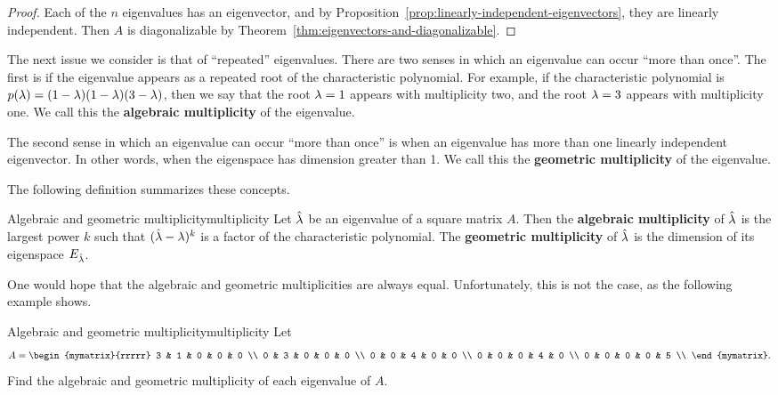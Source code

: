 \begin{proof}
  Each of the $n$ eigenvalues has an eigenvector, and by
  Proposition~\ref{prop:linearly-independent-eigenvectors}, they are
  linearly independent. Then $A$ is diagonalizable by
  Theorem~\ref{thm:eigenvectors-and-diagonalizable}.
\end{proof}

The next issue we consider is that of ``repeated'' eigenvalues. There
are two senses in which an eigenvalue can occur ``more than
once''. The first is if the eigenvalue appears as a repeated root of
the characteristic polynomial. For example, if the characteristic
polynomial is
$p(\lambda) = (1-\lambda)(1-\lambda)(3-\lambda)$, then we say
that the root $\lambda=1$ appears with multiplicity%
 two, and the root
$\lambda=3$ appears with multiplicity one. We call this the
\textbf{algebraic multiplicity}%
%
%
 of the eigenvalue.

The second sense in which an eigenvalue can occur ``more than once''
is when an eigenvalue has more than one linearly independent
eigenvector. In other words, when the eigenspace has dimension greater
than 1. We call this the \textbf{geometric multiplicity}%
%
%
 of the eigenvalue.

The following definition summarizes these concepts.

\begin{definition}{Algebraic and geometric multiplicity}{multiplicity}
  Let $\hat{\lambda}$ be an eigenvalue of a square matrix $A$. Then
  the \textbf{algebraic multiplicity} of $\hat{\lambda}$ is the
  largest power $k$ such that $(\hat{\lambda}-\lambda)^k$ is a
  factor of the characteristic polynomial. The \textbf{geometric
    multiplicity} of $\hat{\lambda}$ is the dimension of its
  eigenspace $E_{\hat{\lambda}}$.
\end{definition}

One would hope that the algebraic and geometric multiplicities are
always equal. Unfortunately, this is not the case, as the following
example shows.

\begin{example}{Algebraic and geometric multiplicity}{multiplicity}
  Let
  \begin{equation*}
    A = \begin{mymatrix}{rrrrr}
      3 & 1 & 0 & 0 & 0 \\
      0 & 3 & 0 & 0 & 0 \\
      0 & 0 & 4 & 0 & 0 \\
      0 & 0 & 0 & 4 & 0 \\
      0 & 0 & 0 & 0 & 5 \\
    \end{mymatrix}.
  \end{equation*}
  Find the algebraic and geometric multiplicity of each eigenvalue
  of $A$.
\end{example}

